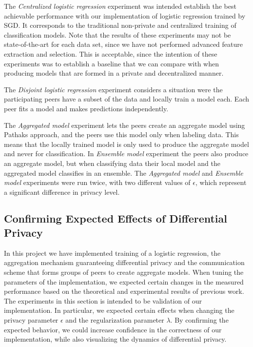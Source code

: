 The \textit{Centralized logistic regression} experiment was intended establish the best achievable performance with our implementation of logistic regression trained by SGD. It corresponds to the traditional non-private and centralized training of classification models. Note that the results of these experiments may not be state-of-the-art for each data set, since we have not performed advanced feature extraction and selection. This is acceptable, since the intention of these experiments was to establish a baseline that we can compare with when producing models that are formed in a private and decentralized manner. 

The \textit{Disjoint logistic regression} experiment considers a situation were the participating peers have a subset of the data and locally train a model each. Each peer fits a model and makes predictions independently.

The \textit{Aggregated model} experiment lets the peers create an aggregate model using Pathaks approach, and the peers use this model only when labeling data. This means that the locally trained model is only used to produce the aggregate model and never for classification. In \textit{Ensemble model} experiment the peers also produce an aggregate model, but when classifying data their local model and the aggregated model classifies in an ensemble. The \textit{Aggregated model} and \textit{Ensemble model} experiments were run twice, with two different values of $\epsilon$, which represent a significant difference in privacy level.

\subsection{Confirming Expected Effects of Differential Privacy}

In this project we have implemented training of a logistic regression, the aggregation mechanism guaranteeing differential privacy and the communication scheme that forms groups of peers to create aggregate models. When tuning the parameters of the implementation, we expected certain changes in the measured performance based on the theoretical and experimental results of previous work. The experiments in this section is intended to be validation of our implementation. In particular, we expected certain effects when changing the privacy parameter $\epsilon$ and the regularization parameter $\lambda$. By confirming the expected behavior, we could increase confidence in the correctness of our implementation, while also visualizing the dynamics of differential privacy.

